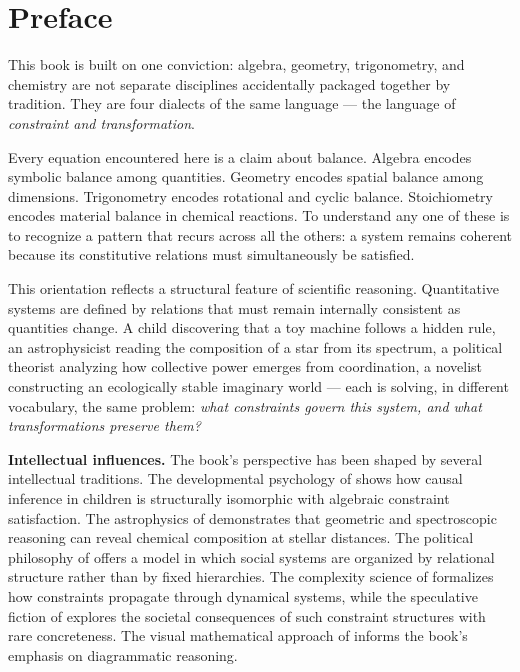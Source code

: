 \documentclass[11pt, openany]{book}
\theoremstyle{plain}
\theoremstyle{definition}
\theoremstyle{remark}
\begin{document}
\chapter*{Preface}

This book is built on one conviction: algebra, geometry, trigonometry, and
chemistry are not separate disciplines accidentally packaged together by
tradition. They are four dialects of the same language --- the language of
\emph{constraint and transformation}.

Every equation encountered here is a claim about balance. Algebra encodes
symbolic balance among quantities. Geometry encodes spatial balance among
dimensions. Trigonometry encodes rotational and cyclic balance. Stoichiometry
encodes material balance in chemical reactions. To understand any one of these
is to recognize a pattern that recurs across all the others: a system remains
coherent because its constitutive relations must simultaneously be satisfied.

This orientation reflects a structural feature of scientific reasoning.
Quantitative systems are defined by relations that must remain internally
consistent as quantities change. A child discovering that a toy machine follows
a hidden rule, an astrophysicist reading the composition of a star from its
spectrum, a political theorist analyzing how collective power emerges from
coordination, a novelist constructing an ecologically stable imaginary world ---
each is solving, in different vocabulary, the same problem: \emph{what
constraints govern this system, and what transformations preserve them?}

\medskip\noindent\textbf{Intellectual influences.}
The book's perspective has been shaped by several intellectual traditions. The
developmental psychology of \citet{Gopnik2009} shows how causal inference in
children is structurally isomorphic with algebraic constraint satisfaction. The
astrophysics of \citet{PayneGaposchkin1925} demonstrates that geometric and
spectroscopic reasoning can reveal chemical composition at stellar distances.
The political philosophy of \citet{Arendt1958} offers a model in which social
systems are organized by relational structure rather than by fixed hierarchies.
The complexity science of \citet{Juarrero1999} formalizes how constraints
propagate through dynamical systems, while the speculative fiction of
\citet{LeGuin1974} explores the societal consequences of such constraint
structures with rare concreteness. The visual mathematical approach of
\citet{Needham1997,Needham2021} informs the book's emphasis on diagrammatic
reasoning.
\end{document}
